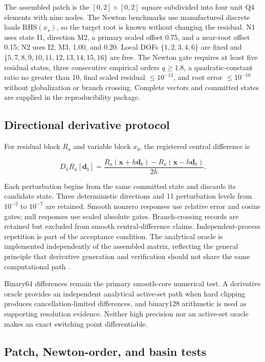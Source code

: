 \documentclass[preprint,12pt,authoryear]{elsarticle}
\begin{document}
The assembled patch is the $[0,2]\times[0,2]$ square subdivided into four unit Q4 elements with nine nodes. The Newton benchmarks use manufactured discrete loads $\mathrm{RHS}(x_\star)$, so the target root is known without changing the residual. N1 uses state I1, direction M2, a primary scaled offset 0.75, and a near-root offset 0.15; N2 uses I2, M3, 1.00, and 0.20. Local DOFs $\{1,2,3,4,6\}$ are fixed and $\{5,7,8,9,10,11,12,13,14,15,16\}$ are free. The Newton gate requires at least five residual states, three consecutive empirical orders $q\ge1.8$, a quadratic-constant ratio no greater than 10, final scaled residual $\le10^{-12}$, and root error $\le10^{-10}$ without globalization or branch crossing. Complete vectors and committed states are supplied in the reproducibility package.

\subsection{Directional derivative protocol}

For residual block $R_a$ and variable block $x_b$, the registered central difference is

\begin{equation}
D_hR_a[\mathbf{d}_b]
=\frac{R_a(\mathbf{x}+h\mathbf{d}_b)-R_a(\mathbf{x}-h\mathbf{d}_b)}{2h}.
\end{equation}

Each perturbation begins from the same committed state and discards its candidate state. Three deterministic directions and 11 perturbation levels from $10^{-2}$ to $10^{-7}$ are retained. Smooth nonzero responses use relative error and cosine gates; null responses use scaled absolute gates. Branch-crossing records are retained but excluded from smooth central-difference claims. Independent-process repetition is part of the acceptance condition. The analytical oracle is implemented independently of the assembled matrix, reflecting the general principle that derivative generation and verification should not share the same computational path \citep{griewank2008}.

Binary64 differences remain the primary smooth-core numerical test. A derivative oracle provides an independent analytical active-set path when hard clipping produces cancellation-limited differences, and binary128 arithmetic is used as supporting resolution evidence. Neither high precision nor an active-set oracle makes an exact switching point differentiable.

\subsection{Patch, Newton-order, and basin tests}
\end{document}
